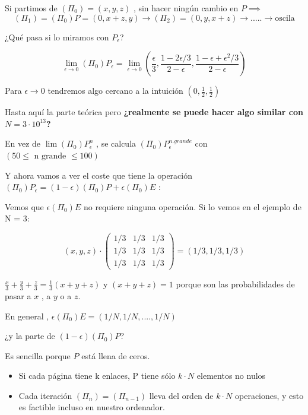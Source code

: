 \begin{example}
Si partimos de $\left(\Pi_0\right)= \left(x,y,z\right)$ , sin hacer ningún cambio en $P \implies$
$$\left(\Pi_1\right) = \left(\Pi_0\right)P = \left(0,x+z,y\right)\rightarrow \left(\Pi_2\right) = \left(0,y,x+z\right) \rightarrow ..... \rightarrow \text{oscila}$$

¿Qué pasa si lo miramos con $P_{\epsilon}$?

$$\lim\limits_{\epsilon \rightarrow 0} \left(\Pi_0\right)P_{\epsilon} = \lim\limits_{\epsilon \rightarrow 0}\left(\frac{\epsilon}{3}, \frac{1- 2\epsilon/3}{2-\epsilon}, \frac{1-\epsilon +  \epsilon^2/3}{2- \epsilon}\right)$$

Para $\epsilon \rightarrow 0$ tendremos algo cercano a la intuición $\left(0, \frac{1}{2}, \frac{1}{2}\right)$
\end{example}


Hasta aquí la parte teórica pero \textbf{¿realmente se puede hacer algo similar con $N = 3\cdot 10^{13}$?}

En vez de $\lim\left(\Pi_0\right)P_{\epsilon}^n$ , se calcula $\left(\Pi_0\right)P_{\epsilon}^{n.grande} $ con $\left(50 \leq \text{ n grande }\leq 100\right)$

Y ahora vamos a ver el coste que tiene la operación $\left(\Pi_0\right)P_{\epsilon} = \left(1-\epsilon\right)\left(\Pi_0\right)P + \epsilon\left(\Pi_0\right)E$ :

Vemos que $\epsilon\left(\Pi_0\right)E$ no requiere ninguna operación. Si lo vemos en el ejemplo de N = 3:

$$(x , y , z)\cdot \left( \begin{array}{ccc}
1/3 & 1/3 & 1/3 \\
1/3 & 1/3 & 1/3 \\
1/3 & 1/3 & 1/3 \end{array} \right) = (1/3 , 1/3 , 1/3)$$

\obs $\frac{x}{3} + \frac{y}{3} + \frac{z}{3} = \frac{1}{3}(x + y + z)$ y $(x +y +z)=1$ porque son las probabilidades de pasar a $x$ , a $y$ o a $z$.

En general , $\epsilon(\Pi_0)E = (1/N , 1/N, ....,1/N)$

¿y la parte de $(1-\epsilon)(\Pi_0)P$?

Es sencilla porque $P$ está llena de ceros.
\begin{itemize}
	\item Si cada página tiene k enlaces, P tiene sólo $k\cdot N$ elementos no nulos
	\item Cada iteración $(\Pi_n) =(\Pi_{n-1})$ lleva del orden de $k\cdot N$ operaciones, y esto es factible incluso en nuestro ordenador.
\end{itemize}


